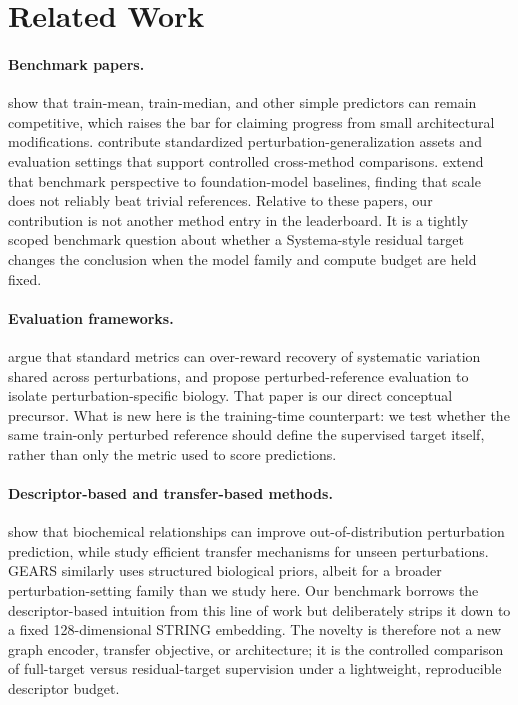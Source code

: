 \documentclass{article}
\begin{document}
\section{Related Work}
\label{sec:related}

\paragraph{Benchmark papers.}
\citet{kernfeld2025expressionforecasting} show that train-mean, train-median, and other simple predictors can remain competitive, which raises the bar for claiming progress from small architectural modifications. \citet{wei2026benchmarking} contribute standardized perturbation-generalization assets and evaluation settings that support controlled cross-method comparisons. \citet{csendes2025benchmarking} extend that benchmark perspective to foundation-model baselines, finding that scale does not reliably beat trivial references. Relative to these papers, our contribution is not another method entry in the leaderboard. It is a tightly scoped benchmark question about whether a Systema-style residual target changes the conclusion when the model family and compute budget are held fixed.

\paragraph{Evaluation frameworks.}
\citet{vinastorne2025systema} argue that standard metrics can over-reward recovery of systematic variation shared across perturbations, and propose perturbed-reference evaluation to isolate perturbation-specific biology. That paper is our direct conceptual precursor. What is new here is the training-time counterpart: we test whether the same train-only perturbed reference should define the supervised target itself, rather than only the metric used to score predictions.

\paragraph{Descriptor-based and transfer-based methods.}
\citet{wenkel2025txpert} show that biochemical relationships can improve out-of-distribution perturbation prediction, while \citet{scholkemper2026c3tl} study efficient transfer mechanisms for unseen perturbations. GEARS \citep{roohani2023gears} similarly uses structured biological priors, albeit for a broader perturbation-setting family than we study here. Our benchmark borrows the descriptor-based intuition from this line of work but deliberately strips it down to a fixed 128-dimensional STRING embedding. The novelty is therefore not a new graph encoder, transfer objective, or architecture; it is the controlled comparison of full-target versus residual-target supervision under a lightweight, reproducible descriptor budget.
\end{document}
